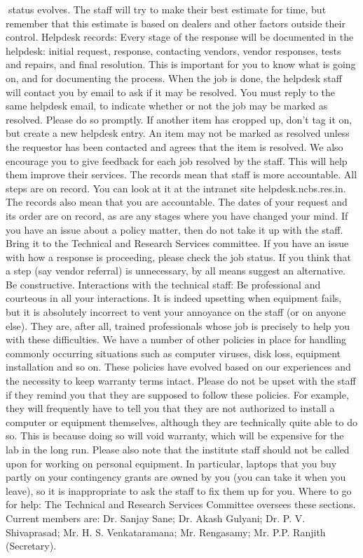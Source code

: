 \documentclass[a4paper,10pt]{article}
\begin{document}
status evolves. The staff will try to make their best estimate for time, but remember that this
estimate is based on dealers and other factors outside their control.
Helpdesk records: Every stage of the response will be documented in the helpdesk: initial
request, response, contacting vendors, vendor responses, tests and repairs, and final
resolution. This is important for you to know what is going on, and for documenting the
process. When the job is done, the helpdesk staff will contact you by email to ask if it may
be resolved. You must reply to the same helpdesk email, to indicate whether or not the job
may be marked as resolved. Please do so promptly. If another item has cropped up, don’t tag
it on, but create a new helpdesk entry. An item may not be marked as resolved unless the
requestor has been contacted and agrees that the item is resolved. We also encourage you to
give feedback for each job resolved by the staff. This will help them improve their services.
The records mean that staff is more accountable. All steps are on record. You can look at it
at the intranet site helpdesk.ncbs.res.in. The records also mean that you are accountable. The
dates of your request and its order are on record, as are any stages where you have changed
your mind. If you have an issue about a policy matter, then do not take it up with the staff.
Bring it to the Technical and Research Services committee. If you have an issue with how a
response is proceeding, please check the job status. If you think that a step (say vendor
referral) is unnecessary, by all means suggest an alternative. Be constructive.
Interactions with the technical staff: Be professional and courteous in all your
interactions. It is indeed upsetting when equipment fails, but it is absolutely incorrect to vent
your annoyance on the staff (or on anyone else). They are, after all, trained professionals
whose job is precisely to help you with these difficulties. We have a number of other
policies in place for handling commonly occurring situations such as computer viruses, disk
loss, equipment installation and so on. These policies have evolved based on our
experiences and the necessity to keep warranty terms intact. Please do not be upset with the
staff if they remind you that they are supposed to follow these policies. For example, they
will frequently have to tell you that they are not authorized to install a computer or
equipment themselves, although they are technically quite able to do so. This is because
doing so will void warranty, which will be expensive for the lab in the long run. Please also
note that the institute staff should not be called upon for working on personal equipment. In
particular, laptops that you buy partly on your contingency grants are owned by you (you
can take it when you leave), so it is inappropriate to ask the staff to fix them up for you.
Where to go for help:
The Technical and Research Services Committee oversees these sections. Current members
are: Dr. Sanjay Sane; Dr. Akash Gulyani; Dr. P. V. Shivaprasad; Mr. H. S. Venkataramana;
Mr. Rengasamy; Mr. P.P. Ranjith (Secretary).
\end{document}
